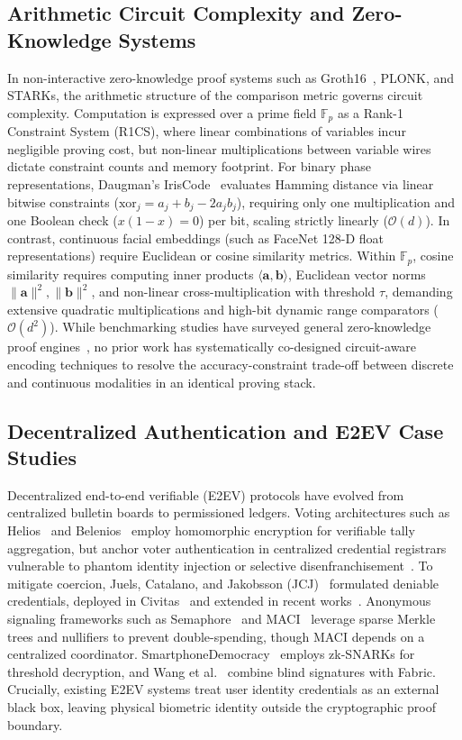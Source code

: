 \documentclass[10pt,letterpaper,journal]{IEEEtran}
\begin{document}
\subsection{Arithmetic Circuit Complexity and Zero-Knowledge Systems}
\label{subsec:rel_circuit}
In non-interactive zero-knowledge proof systems such as Groth16~\cite{Groth2016}, PLONK, and STARKs, the arithmetic structure of the comparison metric governs circuit complexity. Computation is expressed over a prime field $\mathbb{F}_p$ as a Rank-1 Constraint System (R1CS), where linear combinations of variables incur negligible proving cost, but non-linear multiplications between variable wires dictate constraint counts and memory footprint.
For binary phase representations, Daugman's IrisCode~\cite{Daugman2004,Daugman2016} evaluates Hamming distance via linear bitwise constraints ($\text{xor}_j = a_j + b_j - 2a_j b_j$), requiring only one multiplication and one Boolean check ($x(1-x)=0$) per bit, scaling strictly linearly ($\mathcal{O}(d)$). In contrast, continuous facial embeddings (such as FaceNet 128-D float representations) require Euclidean or cosine similarity metrics. Within $\mathbb{F}_p$, cosine similarity requires computing inner products $\langle \mathbf{a}, \mathbf{b} \rangle$, Euclidean vector norms $\|\mathbf{a}\|^2, \|\mathbf{b}\|^2$, and non-linear cross-multiplication with threshold $\tau$, demanding extensive quadratic multiplications and high-bit dynamic range comparators ($\mathcal{O}(d^2)$). While benchmarking studies have surveyed general zero-knowledge proof engines~\cite{OudeRoelink2024,zkSABER2025}, no prior work has systematically co-designed circuit-aware encoding techniques to resolve the accuracy-constraint trade-off between discrete and continuous modalities in an identical proving stack.

\subsection{Decentralized Authentication and E2EV Case Studies}
\label{subsec:rel_e2ev}
Decentralized end-to-end verifiable (E2EV) protocols have evolved from centralized bulletin boards to permissioned ledgers. Voting architectures such as Helios~\cite{Adida2008} and Belenios~\cite{Cortier2019} employ homomorphic encryption for verifiable tally aggregation, but anchor voter authentication in centralized credential registrars vulnerable to phantom identity injection or selective disenfranchisement~\cite{Jones2012,NASEM2018}. To mitigate coercion, Juels, Catalano, and Jakobsson (JCJ)~\cite{Juels2005} formulated deniable credentials, deployed in Civitas~\cite{Civitas2008} and extended in recent works~\cite{eprint2023_1578,Kho2025}. Anonymous signaling frameworks such as Semaphore~\cite{Gurkan2020} and MACI~\cite{Buterin2020} leverage sparse Merkle trees and nullifiers to prevent double-spending, though MACI depends on a centralized coordinator. SmartphoneDemocracy~\cite{Jozwik2025} employs zk-SNARKs for threshold decryption, and Wang et al.~\cite{Wang2024} combine blind signatures with Fabric. Crucially, existing E2EV systems treat user identity credentials as an external black box, leaving physical biometric identity outside the cryptographic proof boundary.
\end{document}
